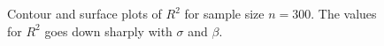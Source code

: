 \documentclass[11pt]{article}
\begin{document}
\begin{figure}[hbtp]
   \centering
       \caption{Contour and surface plots of $R^2$ for sample size $n =300$. The values for $R^2$ goes down sharply with $\sigma$ and $\beta$.}
       \label{fig:contour_rsq}
\end{figure}
\end{document}
